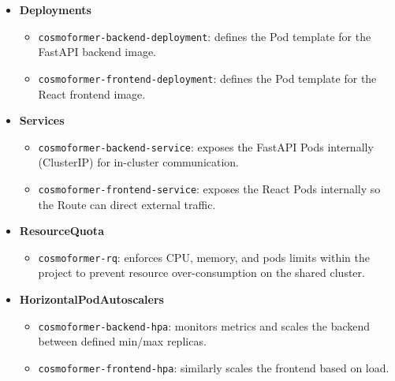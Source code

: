 \begin{itemize}
  \item \textbf{Deployments}
    \begin{itemize}
      \item \texttt{cosmoformer-backend-deployment}: defines the Pod template for the FastAPI backend image.
      \item \texttt{cosmoformer-frontend-deployment}: defines the Pod template for the React frontend image.
    \end{itemize}
    
  \item \textbf{Services}
    \begin{itemize}
      \item \texttt{cosmoformer-backend-service}: exposes the FastAPI Pods internally (ClusterIP) for in-cluster communication.
      \item \texttt{cosmoformer-frontend-service}: exposes the React Pods internally so the Route can direct external traffic.
    \end{itemize}


  \item \textbf{ResourceQuota}
    \begin{itemize}
      \item \texttt{cosmoformer-rq}: enforces CPU, memory, and pods limits within the project to prevent resource over-consumption on the shared cluster.
    \end{itemize}

  \item \textbf{HorizontalPodAutoscalers}
    \begin{itemize}
      \item \texttt{cosmoformer-backend-hpa}: monitors metrics and scales the backend between defined min/max replicas.
      \item \texttt{cosmoformer-frontend-hpa}: similarly scales the frontend based on load.
    \end{itemize}
\end{itemize}

